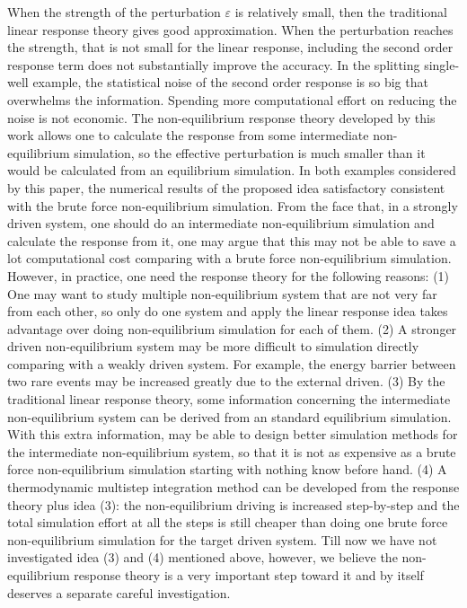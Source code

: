 \documentclass[aip,jcp,a4paper,reprint,onecolumn]{revtex4-1}
\newcommand{\eps}{\varepsilon}
\begin{document}
When the strength of the perturbation $\eps$ is relatively small, then
the traditional linear response theory gives good approximation.  When
the perturbation reaches the strength, that is not small for the
linear response, including the second order response term does not
substantially improve the accuracy.
In the splitting single-well example, the statistical
noise of the second order response is so big that overwhelms the
information. Spending more computational effort on reducing the noise
is not economic. The non-equilibrium response theory developed by this
work allows one to calculate the response from some intermediate
non-equilibrium simulation, so the effective perturbation is much
smaller than it would be calculated from an equilibrium
simulation.
In both examples considered by this paper, the
numerical results of the proposed idea  satisfactory consistent with the
brute force non-equilibrium simulation.
From the face that, in a strongly driven system,
one should do an intermediate non-equilibrium
simulation and calculate the response from it,
one may argue that this may not be able to
save a lot computational cost comparing with a brute force
non-equilibrium simulation.  However, in practice, one need the
response theory for the following reasons: (1) One may want to study
multiple non-equilibrium system that are not very far from each other,
so only do one system and apply the linear response idea takes
advantage over doing non-equilibrium simulation for each of them.
(2) A stronger driven non-equilibrium system may be more difficult to
simulation directly comparing with a weakly driven system. For
example, the energy barrier between two rare events may be increased
greatly due to the external driven. (3) By the traditional linear
response theory, some information concerning the intermediate
non-equilibrium system can be derived from an standard equilibrium
simulation.
With this extra information, may be able to design better simulation methods
for the intermediate non-equilibrium system,
so that it is not as expensive as a brute force non-equilibrium
simulation starting with nothing know before hand.
(4) A thermodynamic multistep integration method can be developed from the
response theory plus idea (3): the non-equilibrium driving is increased
step-by-step and the total simulation effort at all the steps is still
cheaper than doing one brute force non-equilibrium simulation for the
target driven system.
Till now we have not investigated idea (3) and (4) mentioned above,
however, we believe the non-equilibrium response theory is a very
important step toward it and by itself deserves a separate careful
investigation.
\end{document}

